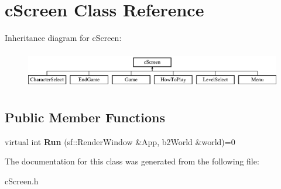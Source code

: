 \hypertarget{classc_screen}{}\section{c\+Screen Class Reference}
\label{classc_screen}
Inheritance diagram for c\+Screen\+:\begin{figure}[H]
\begin{center}
\leavevmode
\includegraphics[height=1.666667cm]{classc_screen}
\end{center}
\end{figure}
\subsection*{Public Member Functions}
\begin{DoxyCompactItemize}
\item 
virtual int {\bfseries Run} (sf\+::\+Render\+Window \&App, b2\+World \&world)=0\hypertarget{classc_screen_ac66033c08d86df01dd626ad39c81d0d1}{}\label{classc_screen_ac66033c08d86df01dd626ad39c81d0d1}

\end{DoxyCompactItemize}


The documentation for this class was generated from the following file\+:\begin{DoxyCompactItemize}
\item 
c\+Screen.\+h\end{DoxyCompactItemize}
